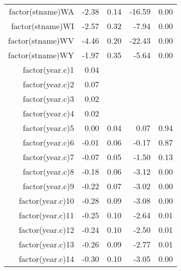 \begin{table}[ht]
\begin{tabular}{rrrrr}
  factor(stname)WA & -2.38 & 0.14 & -16.59 & 0.00 \\ 
  factor(stname)WI & -2.57 & 0.32 & -7.94 & 0.00 \\ 
  factor(stname)WV & -4.46 & 0.20 & -22.43 & 0.00 \\ 
  factor(stname)WY & -1.97 & 0.35 & -5.64 & 0.00 \\ 
  factor(year.c)1 & 0.04 &  &  &  \\ 
  factor(year.c)2 & 0.07 &  &  &  \\ 
  factor(year.c)3 & 0.02 &  &  &  \\ 
  factor(year.c)4 & 0.02 &  &  &  \\ 
  factor(year.c)5 & 0.00 & 0.04 & 0.07 & 0.94 \\ 
  factor(year.c)6 & -0.01 & 0.06 & -0.17 & 0.87 \\ 
  factor(year.c)7 & -0.07 & 0.05 & -1.50 & 0.13 \\ 
  factor(year.c)8 & -0.18 & 0.06 & -3.12 & 0.00 \\ 
  factor(year.c)9 & -0.22 & 0.07 & -3.02 & 0.00 \\ 
  factor(year.c)10 & -0.28 & 0.09 & -3.08 & 0.00 \\ 
  factor(year.c)11 & -0.25 & 0.10 & -2.64 & 0.01 \\ 
  factor(year.c)12 & -0.24 & 0.10 & -2.50 & 0.01 \\ 
  factor(year.c)13 & -0.26 & 0.09 & -2.77 & 0.01 \\ 
  factor(year.c)14 & -0.30 & 0.10 & -3.05 & 0.00 \\ 
   \hline
\end{tabular}
\end{table}
